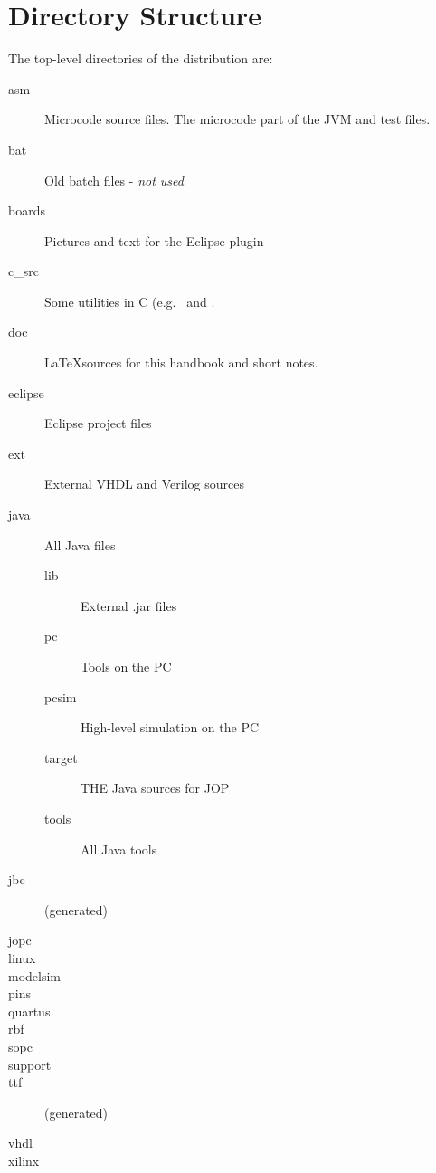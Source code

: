 \section{Directory Structure}

The top-level directories of the distribution are:

\begin{description}
    \item[asm] Microcode source files. The microcode part of the JVM
    and test files.
    \item[bat] Old batch files - \emph{not used}
    \item[boards] Pictures and text for the Eclipse plugin
    \item[c\_src] Some utilities in C (e.g.\  and
    .
    \item[doc] \LaTeX sources for this handbook and short notes.
    \item[eclipse] Eclipse project files
    \item[ext] External VHDL and Verilog sources
    \item[java] All Java files
    \begin{description}
        \item[lib] External .jar files
        \item[pc] Tools on the PC
        \item[pcsim] High-level simulation on the PC
        \item[target] THE Java sources for JOP
        \item[tools] All Java tools
    \end{description}
    \item[jbc] (generated)
    \item[jopc]
    \item[linux]
    \item[modelsim]
    \item[pins]
    \item[quartus]
    \item[rbf]
    \item[sopc]
    \item[support]
    \item[ttf] (generated)
    \item[vhdl]
    \item[xilinx]
\end{description}
